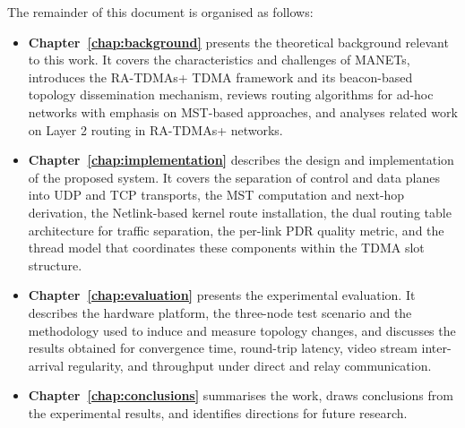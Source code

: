 The remainder of this document is organised as follows:

\begin{itemize}

    \item \textbf{Chapter~\ref{chap:background}} presents the theoretical
    background relevant to this work. It covers the characteristics and
    challenges of MANETs, introduces the RA-TDMAs+ TDMA framework and its
    beacon-based topology dissemination mechanism, reviews routing algorithms
    for ad-hoc networks with emphasis on MST-based approaches, and analyses
    related work on Layer 2 routing in RA-TDMAs+ networks.

    \item \textbf{Chapter~\ref{chap:implementation}} describes the design and
    implementation of the proposed system. It covers the separation of control
    and data planes into UDP and TCP transports, the MST computation and
    next-hop derivation, the Netlink-based kernel route installation, the dual
    routing table architecture for traffic separation, the per-link PDR quality
    metric, and the thread model that coordinates these components within the
    TDMA slot structure.

    \item \textbf{Chapter~\ref{chap:evaluation}} presents the experimental
    evaluation. It describes the hardware platform, the three-node test
    scenario and the methodology used to induce and measure topology changes,
    and discusses the results obtained for convergence time, round-trip
    latency, video stream inter-arrival regularity, and throughput under direct
    and relay communication.

    \item \textbf{Chapter~\ref{chap:conclusions}} summarises the work, draws
    conclusions from the experimental results, and identifies directions for
    future research.

\end{itemize}
